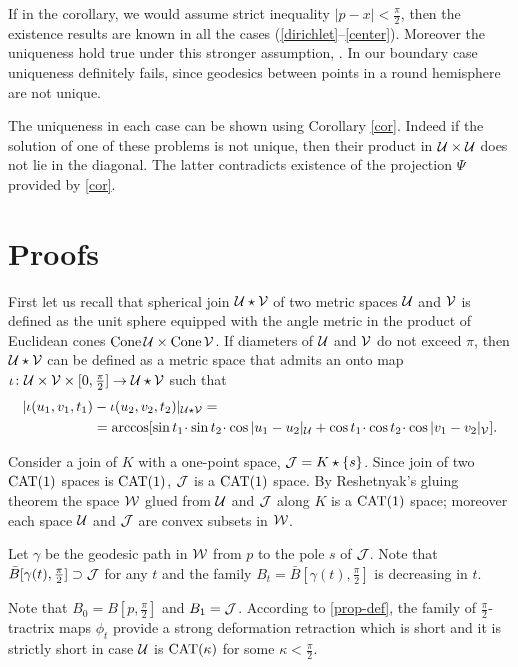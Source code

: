 \documentclass[oneside,a4paper, 12pt]{article}
\begin{document}
If in the corollary, we would assume strict inequality $|p-x|< \tfrac\pi2$, then the existence results are known  in all the cases (\ref{dirichlet}--\ref{center}).
Moreover the uniqueness hold true under this stronger assumption,
\cite{Yokota,Serbinowski}.
In our boundary case uniqueness definitely fails, since geodesics between points in a round hemisphere are not unique.

The uniqueness in each case can be shown using Corollary \ref{cor}.
Indeed if the solution of one of these problems is not unique, then their product in ${\mathcal{U}}\times {\mathcal{U}}$ does not lie in the diagonal.
The latter contradicts existence of the projection $\Psi$ provided by \ref{cor}.

\section{Proofs}\label{sec:proofs}

First let us recall that spherical join $\mathcal{U}\star\mathcal{V}$ of two metric spaces $\mathcal{U}$ and $\mathcal{V}$
is defined as the unit sphere equipped with the angle metric in the product of Euclidean cones $\mathop{\rm Cone}\nolimits \mathcal{U}\times \mathop{\rm Cone}\nolimits\mathcal{V}$.
If diameters of $\mathcal{U}$ and $\mathcal{V}$ do not exceed $\pi$, then $\mathcal{U}\star\mathcal{V}$
can be defined as a metric space that admits an onto map $\iota\colon\mathcal{U}\times\mathcal{V}\times[0,\tfrac\pi2]\to \mathcal{U}\star\mathcal{V}$ such that
\begin{align*}
|\iota(u_1,v_1,t_1)&-\iota(u_2,v_2,t_2)|_{\spc{U}\star\spc{V}}=
\\
&=\arccos[\sin t_1\cdot\sin t_2\cdot \cos|u_1-u_2|_{\spc{U}}+\cos t_1\cdot \cos t_2\cdot \cos|v_1-v_2|_{\spc{V}}].
\end{align*}

Consider a join of  $K$ with a one-point space, $\mathcal{J}=K\star \{s\}$.
Since join of two $\mathrm{CAT}(1)$ spaces is $\mathrm{CAT}(1)$, $\mathcal{J}$ is a $\mathrm{CAT}(1)$ space.
By Reshetnyak's gluing theorem the space $\mathcal{W}$ glued from ${\mathcal{U}}$ and $\mathcal{J}$ along $K$ is a $\mathrm{CAT}(1)$ space;
moreover each space ${\mathcal{U}}$ and $\mathcal{J}$ are convex subsets in $\mathcal{W}$.

Let $\gamma$ be the geodesic path in $\mathcal{W}$ from $p$ to the pole $s$ of $\mathcal{J}$.
Note that $\bar B[\gamma(t),\tfrac\pi2]\supset \mathcal{J}$ for any $t$  
and the family $B_t=\bar B[\gamma(t),\tfrac\pi2]$ is decreasing in $t$.

Note that $B_0=B[p,\tfrac\pi 2]$ and $B_1=\mathcal{J}$.
According to \ref{prop-def}, the family of $\tfrac\pi2$-tractrix maps $\phi_t$ provide a strong deformation retraction which is short and it is strictly short in case $\mathcal{U}$ is $\mathrm{CAT}(\kappa)$ for some $\kappa<\tfrac\pi2$.
\end{document}
